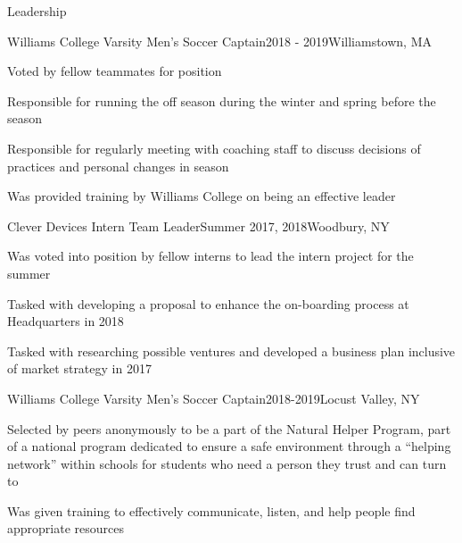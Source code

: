 \documentclass{resume} %
\begin{document}
\begin{rSection}{Leadership}
\begin{rSubsection}{Williams College Varsity Men's Soccer Captain}{2018 - 2019}{}{Williamstown, MA}
\item Voted by fellow teammates for position
\item Responsible for running the off season during the winter and spring before the season
\item Responsible for regularly meeting with coaching staff to discuss decisions of practices and personal changes in season
\item Was provided training by Williams College on being an effective leader
\end{rSubsection}


\begin{rSubsection}{Clever Devices Intern Team Leader}{Summer 2017, 2018}{}{Woodbury, NY}
\item Was voted into position by fellow interns to lead the intern project for the summer
\item Tasked with developing a proposal to enhance the on-boarding process at Headquarters in 2018
\item Tasked with researching possible ventures and developed a business plan inclusive of market strategy in 2017
\end{rSubsection}


\begin{rSubsection}{Williams College Varsity Men's Soccer Captain}{2018-2019}{}{Locust Valley, NY}
\item Selected by peers anonymously to be a part of the Natural Helper Program, part of a national program dedicated to ensure a safe
environment through a “helping network” within schools for students who need a person they trust and can turn to
\item Was given training to effectively communicate, listen, and help people find appropriate resources
\end{rSubsection}
\end{rSection}
\end{document}
